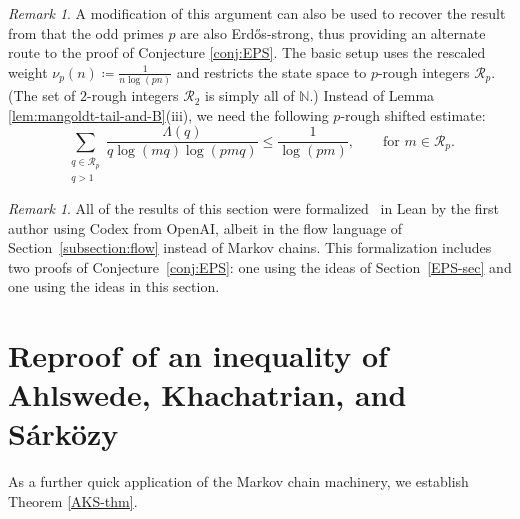\documentclass[12pt]{amsart}
\theoremstyle{definition}
\theoremstyle{remark}
\newtheorem{remark}[theorem]{Remark}
\numberwithin{equation}{section}
\newcommand{\N}{{\mathbb N}}
\newcommand{\Lam}{\Lambda}
\newcommand{\1}{{\mathbf 1}}
\newcommand{\Erdos}{{Erd\H{o}s}}
\begin{document}
\begin{remark} \label{remark:p-strong}
A modification of this argument can also be used to recover the result from \cite{Lichtman} that the odd primes $p$ are also \Erdos{}-strong, thus providing an alternate route to the proof of Conjecture \ref{conj:EPS}.
The basic setup uses the rescaled weight $\nu_p(n) \coloneq \frac{1}{n\log(pn)}$ and restricts the state space to $p$-rough integers $\mathcal R_p$.
(The set of $2$-rough integers $\mathcal R_2$ is simply all of $\N$.)
Instead of Lemma \ref{lem:mangoldt-tail-and-B}(iii), we need the following $p$-rough shifted estimate:
\begin{equation}\label{p-rough-shifted}
\sum_{\substack{q \in \mathcal R_p\\ q>1}}
\frac{\Lam(q)}{q\log(mq)\log(pmq)}
\leq
\frac{1}{\log(pm)}, \qquad \text{for $m \in \mathcal R_p$.}
\end{equation}
\end{remark}

\begin{remark} \label{remark:lean-erdos164}
All of the results of this section were formalized~\cite{lean-erdos164} in Lean by the first author using Codex from OpenAI, albeit in the flow language of Section~\ref{subsection:flow} instead of Markov chains.
This formalization includes two proofs of Conjecture~\ref{conj:EPS}: one using the ideas of Section~\ref{EPS-sec} and one using the ideas in this section.
\end{remark}

\section{Reproof of an inequality of Ahlswede, Khachatrian, and S\'ark\"ozy}\label{AKS-sec}

As a further quick application of the Markov chain machinery, we establish Theorem \ref{AKS-thm}.
\end{document}
